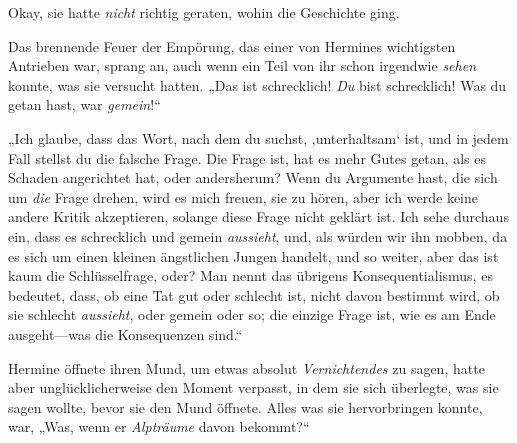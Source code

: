 Okay, sie hatte \emph{nicht} richtig geraten, wohin die Geschichte ging.

Das brennende Feuer der Empörung, das einer von Hermines wichtigsten Antrieben war, sprang an, auch wenn ein Teil von ihr schon irgendwie \emph{sehen} konnte, was sie versucht hatten. „Das ist schrecklich! \emph{Du} bist schrecklich! Was du getan hast, war \emph{gemein}!“

„Ich glaube, dass das Wort, nach dem du suchst, ‚unterhaltsam‘ ist, und in jedem Fall stellst du die falsche Frage. Die Frage ist, hat es mehr Gutes getan, als es Schaden angerichtet hat, oder andersherum? Wenn du Argumente hast, die sich um \emph{die} Frage drehen, wird es mich freuen, sie zu hören, aber ich werde keine andere Kritik akzeptieren, solange diese Frage nicht geklärt ist. Ich sehe durchaus ein, dass es schrecklich und gemein \emph{aussieht}, und, als würden wir ihn mobben, da es sich um einen kleinen ängstlichen Jungen handelt, und so weiter, aber das ist kaum die Schlüsselfrage, oder? Man nennt das übrigens Konsequentialismus, es bedeutet, dass, ob eine Tat gut oder schlecht ist, nicht davon bestimmt wird, ob sie schlecht \emph{aussieht}, oder gemein oder so; die einzige Frage ist, wie es am Ende ausgeht—was die Konsequenzen sind.“

Hermine öffnete ihren Mund, um etwas absolut \emph{Vernichtendes} zu sagen, hatte aber unglücklicherweise den Moment verpasst, in dem sie sich überlegte, was sie sagen wollte, bevor sie den Mund öffnete. Alles was sie hervorbringen konnte, war, „Was, wenn er \emph{Alpträume} davon bekommt?“

